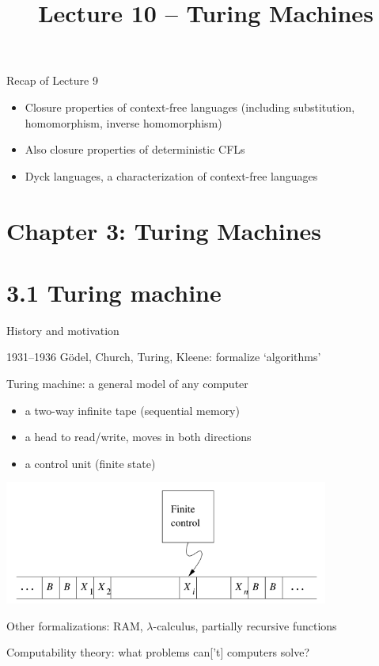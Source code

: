 \documentclass[handout]{beamer}
\title{Lecture 10 -- Turing Machines}
\begin{document}
\frame{\titlepage}


\begin{frame}{Recap of Lecture 9}
	
    \begin{itemize}        
        \item Closure properties of context-free languages (including substitution, homomorphism, inverse homomorphism)
        \item Also closure properties of deterministic CFLs
        \item Dyck languages, a characterization of context-free languages
    \end{itemize}
	
\end{frame}


\section{\sc Chapter 3: Turing Machines}


\section{3.1 Turing machine}


\begin{frame}{History and motivation}
    
    1931--1936 Gödel, Church, Turing, Kleene: formalize \alert{`algorithms'}
    
    \smallskip
    
    \alert{Turing machine}: a general model of any computer
    \begin{itemize}
        \item a two-way infinite \alert{tape} (sequential memory)
        \item a \alert{head} to read/write, moves in both directions
        \item a control unit (finite state)
    \end{itemize}
    \vspace{-9pt}
    \begin{center}
        \includegraphics[width=0.8\textwidth]{files/tm1.PNG}  
    \end{center}        
    \vspace{-9pt}
    Other formalizations: RAM, $\lambda$-calculus, partially recursive functions

    \alert{Computability theory}: what problems can['t] computers solve?

\end{frame}
\end{document}

